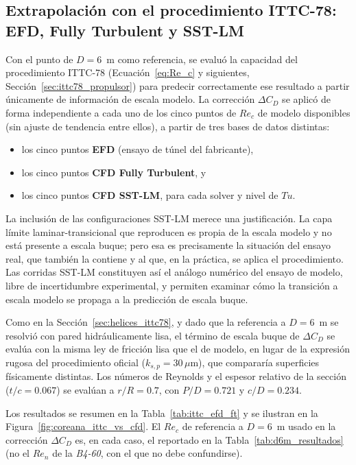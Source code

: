\subsection{Extrapolación con el procedimiento ITTC-78: EFD, Fully Turbulent y SST-LM}
\label{sec:coreana_ittc_efd_ft}

Con el punto de $D=6$~m como referencia, se evaluó la capacidad del procedimiento
ITTC-78 (Ecuación~\ref{eq:Re_c} y siguientes, Sección~\ref{sec:ittc78_propulsor}) para
predecir correctamente ese resultado a partir únicamente de información de escala
modelo. La corrección $\Delta C_D$ se aplicó de forma independiente a cada uno de los
cinco puntos de $Re_c$ de modelo disponibles (sin ajuste de tendencia entre ellos), a
partir de tres bases de datos distintas:

\begin{itemize}
    \item los cinco puntos \textbf{EFD} (ensayo de túnel del fabricante),
    \item los cinco puntos \textbf{CFD Fully Turbulent}, y
    \item los cinco puntos \textbf{CFD SST-LM}, para cada solver y nivel de $Tu$.
\end{itemize}

La inclusión de las configuraciones SST-LM merece una justificación. La capa límite
laminar-transicional que reproducen es propia de la escala modelo y no está presente a
escala buque; pero esa es precisamente la situación del ensayo real, que también la
contiene y al que, en la práctica, se aplica el procedimiento. Las corridas SST-LM
constituyen así el análogo numérico del ensayo de modelo, libre de incertidumbre
experimental, y permiten examinar cómo la transición a escala modelo se propaga a la
predicción de escala buque.

Como en la Sección~\ref{sec:helices_ittc78}, y dado que la referencia a $D=6$~m se
resolvió con pared hidráulicamente lisa, el término de escala buque de $\Delta C_D$ se
evalúa con la misma ley de fricción lisa que el de modelo, en lugar de la expresión
rugosa del procedimiento oficial ($k_{s,p}=30\,\mu$m), que compararía superficies
físicamente distintas. Los números de Reynolds y el espesor relativo de la sección
($t/c=0.067$) se evalúan a $r/R=0.7$, con $P/D=0.721$ y $c/D=0.234$.

Los resultados se resumen en la Tabla~\ref{tab:ittc_efd_ft} y se ilustran en la Figura~\ref{fig:coreana_ittc_vs_cfd}. El $Re_c$ de referencia a
$D=6$~m usado en la corrección $\Delta C_D$ es, en cada caso, el reportado en la
Tabla~\ref{tab:d6m_resultados} (no el $Re_n$ de la \textit{B4-60}, con el que no debe
confundirse).

